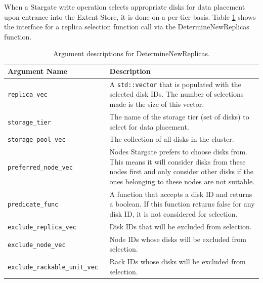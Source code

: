 \documentclass[12pt]{article}
\begin{document}
    When a Stargate write operation selects appropriate disks for data
    placement upon entrance into the Extent Store, it is done on a per-tier
    basis. Table \ref{tbl:determinenewreplicas} shows the interface for a
    replica selection function call via the DetermineNewReplicas function.

    \begin{table}[htbp]
      \caption{Argument descriptions for DetermineNewReplicas.}
      \label{tbl:determinenewreplicas}
      \begin{tabular}{ | p{0.4\linewidth} | p{0.6\linewidth} | }
        \hline
        \textbf{Argument Name} & \textbf{Description} \\ \hline
        \verb|replica_vec| & A \texttt{std::vector} that is populated with the selected
                             disk IDs. The number of selections made is the
                             size of this vector. \\ \hline

        \verb|storage_tier| & The name of the storage tier (set of disks) to
                              select for data placement. \\ \hline
 
        \verb|storage_pool_vec| & The collection of all disks in the cluster.  \\ \hline

        \verb|preferred_node_vec| & Nodes Stargate prefers to choose disks from. This
                                    means it will consider disks from these
                                    nodes first and only consider other disks
                                    if the ones belonging to these nodes are
                                    not suitable. \\ \hline

        \verb|predicate_func| & A function that accepts a disk ID and returns a
                                boolean. If this function returns false
                                for any disk ID, it is not considered for
                                selection. \\ \hline

        \verb|exclude_replica_vec| & Disk IDs that will be excluded from
                                     selection. \\ \hline

        \verb|exclude_node_vec| & Node IDs whose disks will be excluded from
                                  selection. \\ \hline

        \verb|exclude_rackable_unit_vec| & Rack IDs whose disks will be
                                           excluded from selection. \\ \hline

        \hline
      \end{tabular}
    \end{table}
\end{document}

